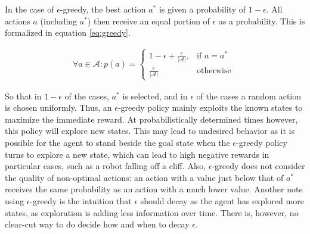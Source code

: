 \documentclass{article}
\begin{document}
In the case of $\epsilon$-greedy, the best action $a^*$ is given a probability of $1-\epsilon$. All actions $a$ (including $a^*$) then receive an equal portion of $\epsilon$ as a probability. This is formalized in equation \ref{eq:greedy}.
\begin{mdframed}
\begin{align}
\forall a \in \mathcal{A}:p(a) = 
\begin{cases}\label{eq:greedy}
	1 - \epsilon + \frac{\epsilon}{|\mathcal{A}|}, & \text{if } a = a^*\\
	\frac{\epsilon}{|\mathcal{A}|} & \text{otherwise }
\end{cases}
\end{align}
\end{mdframed}
So that in $1-\epsilon$ of the cases, $a^*$ is selected, and in $\epsilon$ of the cases a random action is chosen uniformly. Thus, an $\epsilon$-greedy policy mainly exploits the known states to maximize the immediate reward. At probabilistically determined times however, this policy will explore new states. This may lead to undesired behavior as it is possible for the agent to stand beside the goal state when the $\epsilon$-greedy policy turns to explore a new state, which can lead to high negative rewards in particular cases, such as a robot falling off a cliff. Also, $\epsilon$-greedy does not consider the quality of non-optimal actions: an action with a value just below that of $a^*$ receives the same probability as an action with a much lower value. Another note using $\epsilon$-greedy is the intuition that $\epsilon$ should decay as the agent has explored more states, as exploration is adding less information over time. There is, however, no clear-cut way to do decide how and when to decay $\epsilon$.
\end{document}

